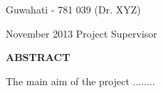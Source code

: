 \documentclass[12pt,a4paper]{report}
\theoremstyle{plain}
\theoremstyle{definition}
\theoremstyle{remark}
\begin{document}
\vspace{4cm}

\noindent Guwahati - 781 039 \hfill (Dr. XYZ)

\noindent November 2013 \hfill Project Supervisor

\clearpage

\begin{center}
{\Large{\bf{ABSTRACT}}}
\end{center}


The main aim of the project ........

\clearpage



\tableofcontents
\clearpage
\listoffigures
\listoftables


\newpage

\setcounter{page}{1}









\nocite{golub} \nocite{gerla}\nocite{m1}\nocite{chang}



\end{document}
